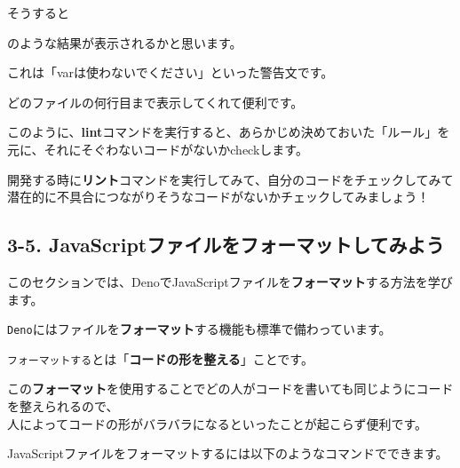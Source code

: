 そうすると

\begin{Shaded}
\begin{Highlighting}[]
\NormalTok{\^{}\^{}\^{}\^{}\^{}\^{}\^{}\^{}\^{}\^{}\^{}\^{}\^{}\^{}\^{}\^{}\^{}\^{}\^{}\^{}\^{}\^{}\^{}\^{}\^{}\^{}\^{}\^{}\^{}\^{}\^{}\^{}\^{}\^{}}


\end{Highlighting}
\end{Shaded}

のような結果が表示されるかと思います。

これは「varは使わないでください」といった警告文です。

どのファイルの何行目まで表示してくれて便利です。

このように、\textbf{lint}コマンドを実行すると、あらかじめ決めておいた「ルール」を元に、それにそぐわないコードがないかcheckします。

開発する時に\textbf{リント}コマンドを実行してみて、自分のコードをチェックしてみて潜在的に不具合につながりそうなコードがないかチェックしてみましょう！

\subsection{3-5.
JavaScriptファイルをフォーマットしてみよう}\label{javascriptux30d5ux30a1ux30a4ux30ebux3092ux30d5ux30a9ux30fcux30deux30c3ux30c8ux3057ux3066ux307fux3088ux3046}

このセクションでは、DenoでJavaScriptファイルを\textbf{フォーマット}する方法を学びます。

\texttt{Deno}にはファイルを\textbf{フォーマット}する機能も標準で備わっています。

\texttt{フォーマットする}とは「\textbf{コードの形を整える}」ことです。

この\textbf{フォーマット}を使用することでどの人がコードを書いても同じようにコードを整えられるので、\\
人によってコードの形がバラバラになるといったことが起こらず便利です。

JavaScriptファイルをフォーマットするには以下のようなコマンドでできます。

